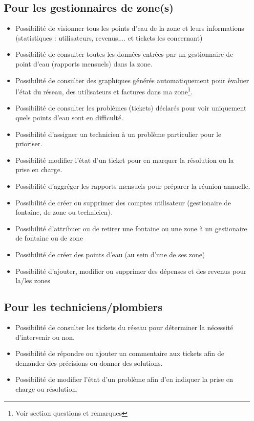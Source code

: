 \documentclass[a4paper, 11pt]{article}
\begin{document}
\subsection{Pour les gestionnaires de zone(s)}
\begin{itemize}
  \item Possibilité de visionner tous les points d'eau de la zone et leurs informations (statistiques : utilisateurs, revenus,... et tickets les concernant)
  \item Possibilité de consulter toutes les données entrées par un gestionnaire de point d'eau (rapports mensuels) dans la zone.
  \item Possibilité de consulter des graphiques générés automatiquement pour évaluer l'état du réseau, des utilisateurs et factures dans ma zone\footnote{Voir section questions et remarques}.
  \item Possibilité de consulter les problèmes (tickets) déclarés pour voir uniquement quels points d'eau sont en difficulté.
  \item Possibilité d'assigner un technicien à un problème particulier pour le prioriser.
  \item Possibilité modifier l'état d'un ticket pour en marquer la résolution ou la prise en charge.
  \item Possibilité d'aggréger les rapports mensuels pour préparer la réunion annuelle. %
  \item Possibilité de créer ou supprimer des comptes utilisateur (gestionaire de fontaine, de zone ou technicien). %
  \item Possibilité d'attribuer ou de retirer une fontaine ou une zone à un gestionaire de fontaine ou de zone
  \item Possibilité de créer des points d'eau (au sein d'une de ses zone)
  \item Possibilité d'ajouter, modifier ou supprimer des dépenses et des revenus pour la/les zones
\end{itemize}

\subsection{Pour les techniciens/plombiers}
\begin{itemize}
  \item Possibilité de consulter les tickets du réseau pour déterminer la nécessité d'intervenir ou non.
  \item Possibilité de répondre ou ajouter un commentaire aux tickets afin de demander des précisions ou donner des solutions.
  \item Possibilité de modifier l'état d'un problème afin d'en indiquer la prise en charge ou résolution.
\end{itemize}
\end{document}
